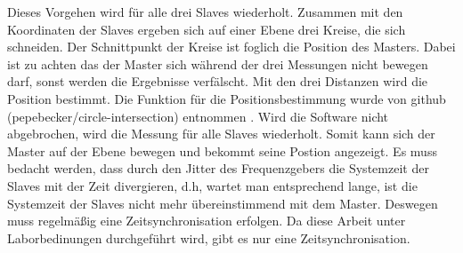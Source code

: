 Dieses Vorgehen wird für alle drei Slaves wiederholt. Zusammen mit den Koordinaten der Slaves ergeben sich auf einer Ebene drei Kreise, die sich schneiden. Der Schnittpunkt der Kreise ist foglich die Position des Masters. Dabei ist zu achten das der Master sich während der drei Messungen nicht bewegen darf, sonst werden die Ergebnisse verfälscht. Mit den drei Distanzen wird die Position bestimmt. Die Funktion für die Positionsbestimmung wurde von github (pepebecker/circle-intersection) entnommen \cite{src_GITHUB_CODE}. Wird die Software nicht abgebrochen, wird die Messung für alle Slaves wiederholt. Somit kann sich der Master auf der Ebene bewegen und bekommt seine Postion angezeigt. Es muss bedacht werden, dass durch den Jitter des Frequenzgebers die Systemzeit der Slaves mit der Zeit divergieren, d.h, wartet man entsprechend lange, ist die Systemzeit der Slaves nicht mehr übereinstimmend mit dem Master. Deswegen muss regelmäßig eine Zeitsynchronisation erfolgen. Da diese Arbeit unter Laborbedinungen durchgeführt wird, gibt es nur eine Zeitsynchronisation.

